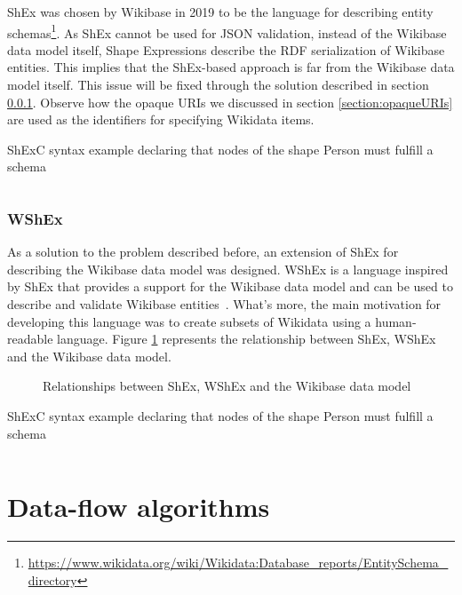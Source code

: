 ShEx was chosen by Wikibase in 2019 to be the language for describing entity schemas\footnote{\url{https://www.wikidata.org/wiki/Wikidata:Database_reports/EntitySchema_directory}}. As ShEx cannot be used for JSON validation, instead of the Wikibase data model itself, Shape Expressions describe the RDF serialization of Wikibase entities. This implies that the ShEx-based approach is far from the Wikibase data model itself. This issue will be fixed through the solution described in section \ref{section:WShEx}. Observe how the opaque URIs we discussed in section \ref{section:opaqueURIs} are used as the identifiers for specifying Wikidata items.

\begin{code}
    \caption{ShExC syntax example declaring that nodes of the shape Person must fulfill a schema}
    \inputminted{shex}{listings/wikibase.shex}
\end{code}

\subsubsection{WShEx}
\label{section:WShEx}

As a solution to the problem described before, an extension of ShEx for describing the Wikibase data model was designed. WShEx is a language inspired by ShEx that provides a support for the Wikibase data model and can be used to describe and validate Wikibase entities~\cite{https://doi.org/10.48550/arxiv.2208.02697}. What's more, the main motivation for developing this language was to create subsets of Wikidata using a human-readable language. Figure \ref{fig:WShEx} represents the relationship between ShEx, WShEx and the Wikibase data model.

\begin{figure}[ht]
    \centering
    
    \caption[Relationships between ShEx, WShEx and the Wikibase data model]{Relationships between ShEx, WShEx and the Wikibase data model~\cite{https://doi.org/10.48550/arxiv.2110.11709}}
    \label{fig:WShEx}
\end{figure}

\begin{code}
    \caption{ShExC syntax example declaring that nodes of the shape Person must fulfill a schema}
    \inputminted{shex}{listings/wshex.shex}
\end{code}

\section{Data-flow algorithms}

